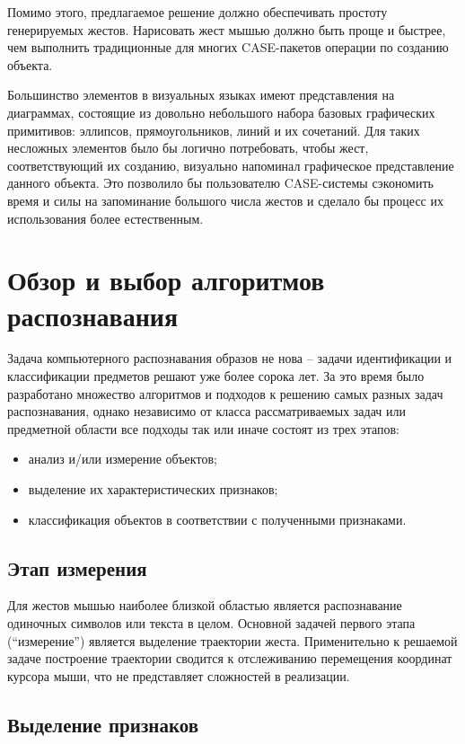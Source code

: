 \documentclass[a5paper]{article}
\begin{document}
Помимо этого, предлагаемое решение должно обеспечивать простоту генерируемых жестов. Нарисовать жест мышью должно быть проще и быстрее, 
чем выполнить традиционные для многих CASE-пакетов операции по созданию объекта. 

Большинство элементов в визуальных языках имеют представления на диаграммах, состоящие из довольно небольшого набора базовых графических 
примитивов: эллипсов, прямоугольников, линий и их сочетаний. Для таких несложных элементов было бы логично потребовать, чтобы жест, 
соответствующий их созданию, визуально напоминал графическое представление данного объекта. Это позволило бы пользователю CASE-системы 
сэкономить время и силы на запоминание большого числа жестов и сделало бы процесс их использования более естественным. 

\section{Обзор и выбор алгоритмов распознавания}
Задача компьютерного распознавания образов не нова -- задачи идентификации и классификации предметов решают уже более сорока лет. За это 
время было разработано множество алгоритмов и подходов к решению самых разных задач распознавания, однако независимо от класса 
рассматриваемых задач или предметной области все подходы так или иначе состоят из трех этапов: 
\begin{itemize}
  \item анализ и/или измерение объектов;
  \item выделение их характеристических признаков;
  \item классификация объектов в соответствии с полученными признаками.
\end{itemize}

\subsection{Этап измерения}
Для жестов мышью наиболее близкой областью является распознавание одиночных символов или текста в целом. Основной задачей первого этапа 
(``измерение'') является выделение траектории жеста. Применительно к решаемой задаче построение траектории сводится к отслеживанию 
перемещения координат курсора мыши, что не представляет сложностей в реализации. 

\subsection{Выделение признаков}
\end{document}
